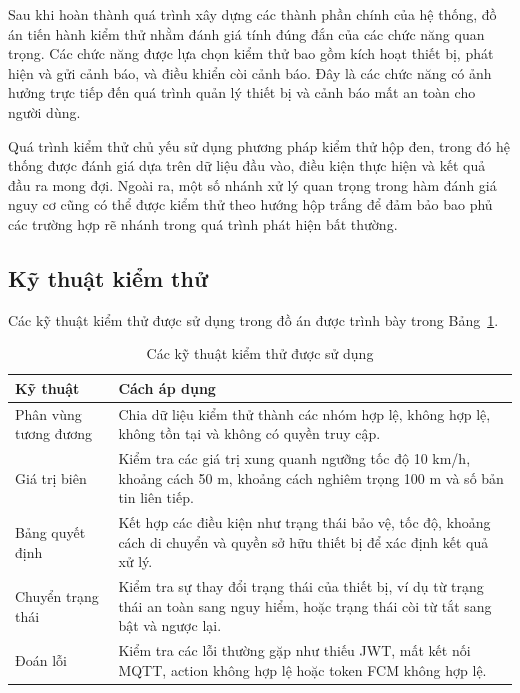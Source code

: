 \documentclass[../DoAn.tex]{subfiles}
\begin{document}
Sau khi hoàn thành quá trình xây dựng các thành phần chính của hệ thống, đồ án tiến hành kiểm thử nhằm đánh giá tính đúng đắn của các chức năng quan trọng. Các chức năng được lựa chọn kiểm thử bao gồm kích hoạt thiết bị, phát hiện và gửi cảnh báo, và điều khiển còi cảnh báo. Đây là các chức năng có ảnh hưởng trực tiếp đến quá trình quản lý thiết bị và cảnh báo mất an toàn cho người dùng.

Quá trình kiểm thử chủ yếu sử dụng phương pháp kiểm thử hộp đen, trong đó hệ thống được đánh giá dựa trên dữ liệu đầu vào, điều kiện thực hiện và kết quả đầu ra mong đợi. Ngoài ra, một số nhánh xử lý quan trọng trong hàm đánh giá nguy cơ cũng có thể được kiểm thử theo hướng hộp trắng để đảm bảo bao phủ các trường hợp rẽ nhánh trong quá trình phát hiện bất thường.

\subsection{Kỹ thuật kiểm thử}

Các kỹ thuật kiểm thử được sử dụng trong đồ án được trình bày trong Bảng~\ref{tab:testing-techniques}.

\begin{table}[H]
\centering
\renewcommand{\arraystretch}{1.3}
\begin{tabular}{|p{}|p{}|}
\hline
\textbf{Kỹ thuật} & \textbf{Cách áp dụng} \\ \hline
Phân vùng tương đương & Chia dữ liệu kiểm thử thành các nhóm hợp lệ, không hợp lệ, không tồn tại và không có quyền truy cập. \\ \hline
Giá trị biên & Kiểm tra các giá trị xung quanh ngưỡng tốc độ 10 km/h, khoảng cách 50 m, khoảng cách nghiêm trọng 100 m và số bản tin liên tiếp. \\ \hline
Bảng quyết định & Kết hợp các điều kiện như trạng thái bảo vệ, tốc độ, khoảng cách di chuyển và quyền sở hữu thiết bị để xác định kết quả xử lý. \\ \hline
Chuyển trạng thái & Kiểm tra sự thay đổi trạng thái của thiết bị, ví dụ từ trạng thái an toàn sang nguy hiểm, hoặc trạng thái còi từ tắt sang bật và ngược lại. \\ \hline
Đoán lỗi & Kiểm tra các lỗi thường gặp như thiếu JWT, mất kết nối MQTT, action không hợp lệ hoặc token FCM không hợp lệ. \\ \hline
\end{tabular}
\caption{Các kỹ thuật kiểm thử được sử dụng}
\label{tab:testing-techniques}
\end{table}
\end{document}
